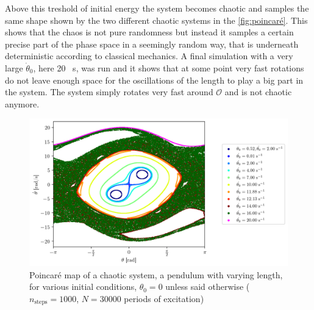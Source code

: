 Above this treshold of initial energy the system becomes chaotic and samples the same shape shown by the two different chaotic systems in the \autoref{fig:poincaré}. This shows that the chaos is not pure randomness but instead it samples a certain precise part of the phase space in a seemingly random way, that is underneath deterministic according to classical mechanics. A final simulation with a very large $\dot\theta_0$, here 20 \si{\per\second}, was run and it shows that at some point very fast rotations do not leave enough space for the oscillations of the length to play a big part in the system. The system simply rotates very fast around $\mathcal{O}$ and is not chaotic anymore.
\begin{figure}[H]
    \centering
    \includegraphics[width=\linewidth]{figures/poincare_overkill.png}
    \caption{Poincaré map of a chaotic system, a pendulum with varying length, for various initial conditions, \(\theta_0=0\) unless said otherwise (\(n_\textrm{steps}=1000\), \(N=30 000\) periods of excitation)}
    \label{fig:poincaré}
\end{figure}





